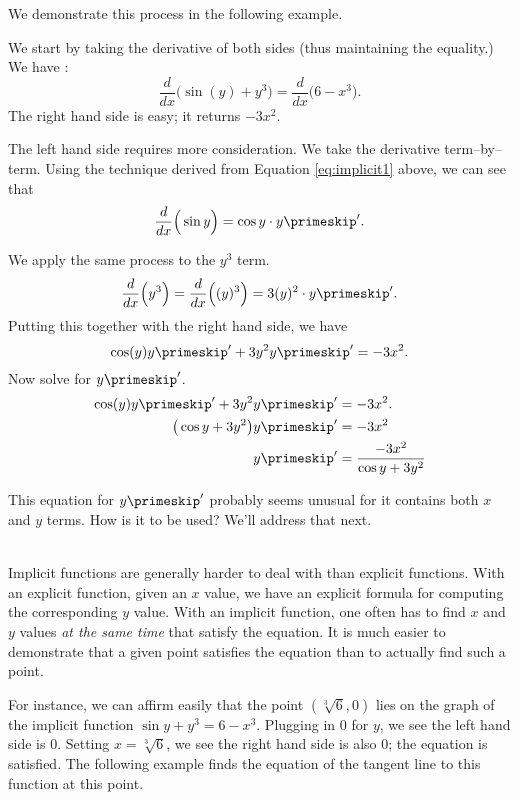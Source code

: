 
We demonstrate this process in the following example.\\

{We start by taking the derivative of both sides (thus maintaining the equality.) We have :
$$ \frac{d}{dx}\Big(\sin(y) + y^3\Big)=\frac{d}{dx}\Big(6-x^3\Big).$$
The right hand side is easy; it returns $-3x^2$. 

The left hand side requires more consideration. We take the derivative term--by--term.  Using the technique derived from Equation \ref{eq:implicit1} above, we can see that $$\frac{d}{dx}\Big(\sin y\Big) = \cos y \cdot y\primeskip'.$$ %

We apply the same process to the $y^3$ term. 
$$\frac{d}{dx}\Big(y^3\Big) = \frac{d}{dx}\Big((y)^3\Big) = 3(y)^2\cdot y\primeskip'.$$
Putting this together with the right hand side, we have
$$\cos(y)y\primeskip'+3y^2y\primeskip' = -3x^2.$$
Now solve for $y\primeskip'$.
		\begin{align*}
		\cos(y)y\primeskip'+3y^2y\primeskip' 	&= -3x^2.\\
		\big(\cos y+3y^2\big)y\primeskip' &=	-3x^2\\
		y\primeskip'&=	\frac{-3x^2}{\cos y+3y^2}
		\end{align*}

This equation for $y\primeskip'$ probably seems unusual for it contains both $x$ and $y$ terms. How is it to be used? We'll address that next.}\\

Implicit functions are generally harder to deal with than explicit functions. With an explicit function, given an $x$ value, we have an explicit formula for computing the corresponding $y$ value. With an implicit function, one often has to find $x$ and $y$ values \textit{at the same time} that satisfy the equation. It is much easier to demonstrate that a given point satisfies the equation than to actually find such a point.

For instance, we can affirm easily that the point $(\sqrt[3]{6},0)$ lies on the graph of the implicit function $\sin y + y^3=6-x^3$. Plugging in $0$ for $y$, we see the left hand side is $0$. Setting $x=\sqrt[3]6$, we see the right hand side is also $0$; the equation is satisfied. The following example finds the equation of the tangent line to this function at this point.\\

